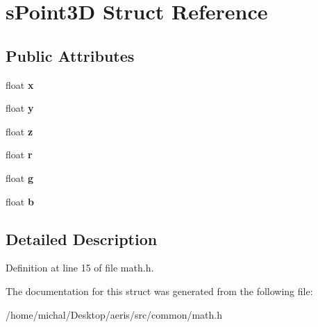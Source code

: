\hypertarget{structsPoint3D}{\section{s\-Point3\-D Struct Reference}
\label{structsPoint3D}
}
\subsection*{Public Attributes}
\begin{DoxyCompactItemize}
\item 
\hypertarget{structsPoint3D_acd4c193396e478aa3c9b7c4c70849036}{float {\bfseries x}}\label{structsPoint3D_acd4c193396e478aa3c9b7c4c70849036}

\item 
\hypertarget{structsPoint3D_a234675cf0d8e2c4dd9673e6f6053d6a1}{float {\bfseries y}}\label{structsPoint3D_a234675cf0d8e2c4dd9673e6f6053d6a1}

\item 
\hypertarget{structsPoint3D_a2a0b8b20e1f52897edaba1c100bcc194}{float {\bfseries z}}\label{structsPoint3D_a2a0b8b20e1f52897edaba1c100bcc194}

\item 
\hypertarget{structsPoint3D_a0a8e9058df01aa712857f7d16f9b6aa0}{float {\bfseries r}}\label{structsPoint3D_a0a8e9058df01aa712857f7d16f9b6aa0}

\item 
\hypertarget{structsPoint3D_a1610fae258ff1dcb06c5c502443a6898}{float {\bfseries g}}\label{structsPoint3D_a1610fae258ff1dcb06c5c502443a6898}

\item 
\hypertarget{structsPoint3D_a79f80d6cc4aff90b3512d52aa8bafc45}{float {\bfseries b}}\label{structsPoint3D_a79f80d6cc4aff90b3512d52aa8bafc45}

\end{DoxyCompactItemize}


\subsection{Detailed Description}


Definition at line 15 of file math.\-h.



The documentation for this struct was generated from the following file\-:\begin{DoxyCompactItemize}
\item 
/home/michal/\-Desktop/aeris/src/common/math.\-h\end{DoxyCompactItemize}
